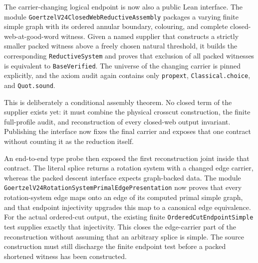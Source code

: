 \documentclass[11pt]{article}
\theoremstyle{definition}
\begin{document}
The carrier-changing logical endpoint is now also a public Lean interface.
The module
\texttt{GoertzelV24ClosedWebReductiveAssembly} packages a varying finite
simple graph with its ordered annular boundary, colouring, and complete
closed-web-at-good-word witness.  Given a named supplier that constructs a
strictly smaller packed witness above a freely chosen natural threshold, it
builds the corresponding \texttt{ReductiveSystem} and proves that exclusion
of all packed witnesses is equivalent to \texttt{BaseVerified}.  The universe
of the changing carrier is pinned explicitly, and the axiom audit again
contains only \texttt{propext}, \texttt{Classical.choice}, and
\texttt{Quot.sound}.

This is deliberately a conditional assembly theorem.  No closed term of the
supplier exists yet: it must combine the physical crosscut construction, the
finite full-profile audit, and reconstruction of every closed-web output
invariant.  Publishing the interface now fixes the final carrier and exposes
that one contract without counting it as the reduction itself.

An end-to-end type probe then exposed the first reconstruction joint inside
that contract.  The literal splice returns a rotation system with a changed
edge carrier, whereas the packed descent interface expects graph-backed data.
The module
\texttt{GoertzelV24RotationSystemPrimalEdgePresentation} now proves that every
rotation-system edge maps onto an edge of its computed primal simple graph,
and that endpoint injectivity upgrades this map to a canonical edge
equivalence.  For the actual ordered-cut output, the existing finite
\texttt{OrderedCutEndpointSimple} test supplies exactly that injectivity.
This closes the edge-carrier part of the reconstruction without assuming that
an arbitrary splice is simple.  The source construction must still discharge
the finite endpoint test before a packed shortened witness has been
constructed.
\end{document}

